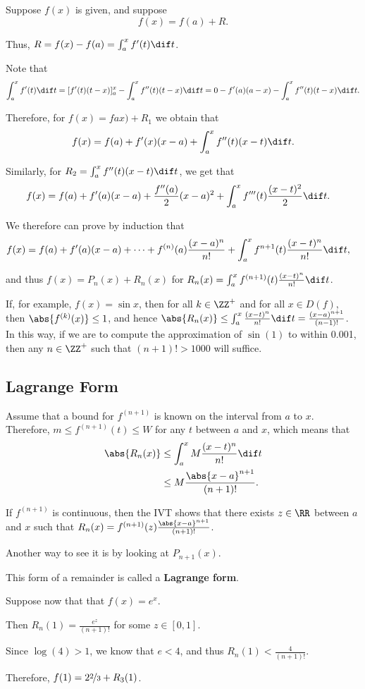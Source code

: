 \documentclass[11pt]{scrartcl}
\begin{document}
Suppose $f(x)$ is given, and suppose 
\begin{equation*}
  f(x) = f(a) +R.
\end{equation*}

Thus, $R = f(x) - f(a) = \int_a^xf'(t)\dif t$. 

Note that
\begin{equation*}
\int_a^x f'(t)\dif t = [f'(t)(t-x)]^x_a-\int_a^xf''(t)(t-x)\dif t =
0-f'(a)(a-x)-\int_a^xf''(t)(t-x)\dif t.
\end{equation*}

Therefore, for $f(x) = fax) + R_1$ we obtain that 
\[f(x)=f(a)+f'(x)(x-a) + \int_a^xf''(t)(x-t)\dif t.\]

Similarly, for $R_2= \int_a^xf''(t)(x-t)\dif t$, we get that
\begin{align}
  f(x) &= f(a) +f'(a)(x-a) +\frac{f''(a)}{2}(x-a)^2+\int_a^xf'''(t)\frac{(x-t)^2}{2}\dif t.
\end{align}

We therefore can prove by induction that
\begin{align}
  f(x) &= f(a) +f'(a)(x-a) +\cdots+f^{(n)}(a)\frac{(x-a)^{n}}{n!}+\int_a^xf^{n+1}(t)\frac{(x-t)^n}{n!}\dif t, 
\end{align}

and thus $f(x) = P_n(x) +R_n(x)$ for $R_n(x) = \int_a^xf^{(n+1)}(t) \frac{(x-t)^n}{n!} \dif t$.


If, for example, $f(x) = \sin x$, then for all $k\in\ZZ^+$ and for all
$x\in D(f)$, then $\abs{f^{(k)}(x)}\leq 1$, and hence
$\abs{R_n(x)}\leq \int_a^x \frac{(x-t)^n}{n!}\dif t =
\frac{(x-a)^{n+1}}{(n-1)!}$. In this way, if we are to compute the
approximation of $\sin(1)$ to within 0.001, then any $n\in\ZZ^+$ such
that $(n+1)! > 1000$ will suffice.

\subsection{Lagrange Form}

Assume that a bound for $f^{(n+1)}$ is known on the interval from
$a$ to $x$. Therefore, $m \leq f^{(n+1)}(t) \leq W$ for any $t$ between
$a$ and $x$, which means that 
\begin{align}
  \abs{R_n(x)}&\leq \int_a^xM \frac{(x-t)^n}{n!}\dif t\\
              &\leq M \frac{\abs{x-a}^{n+1}}{(n+1)!}.
\end{align}

If $f^{(n+1)}$ is continuous, then the IVT shows that there exists
$z\in\RR$ between $a$and $x$ such that
$R_n(x) = f^{(n+1)}(z) \frac{\abs{x-a}^{n+1}}{(n+1)!}$.

Another way to see it is by looking at $P_{n+1}(x)$.

This form of a remainder is called a \textbf{Lagrange form}.

Suppose now that that $f(x) = e^x$.

Then $R_n(1) = \frac{e^z}{(n+1)!}$ for some $z\in [0, 1]$.

Since $\log(4) >1$, we know that $e< 4$, and thus $R_n(1) < \frac{4}{(n+1)!}$. 

Therefore, $f(1) = 2 \nicefrac{2}{3}+R_3(1)$.
\end{document}
